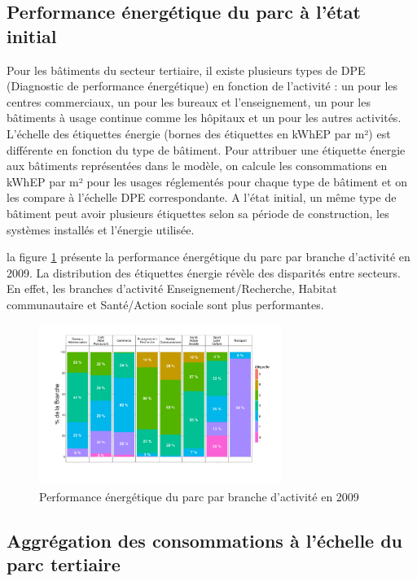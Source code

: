 \documentclass[10.5pt,a4paper]{article}
\begin{document}
{\subsection{Performance énergétique du parc à l'état initial}

Pour les bâtiments du secteur tertiaire, il existe plusieurs types de DPE (Diagnostic de performance énergétique) en fonction de l’activité : un pour les centres commerciaux, un pour les bureaux et l'enseignement, un pour les bâtiments à usage continue comme les hôpitaux et un pour les autres activités. L'échelle des étiquettes énergie (bornes des étiquettes en kWhEP par m²) est différente en fonction du type de bâtiment. Pour attribuer une étiquette énergie aux bâtiments représentées dans le modèle, on calcule les consommations en kWhEP par m² pour les usages réglementés pour chaque type de bâtiment et on les compare à l'échelle DPE correspondante. A l'état initial, un même type de bâtiment peut avoir plusieurs étiquettes selon sa période de construction, les systèmes installés et l'énergie utilisée.  

la figure \ref{Parcetiqbranche} présente la performance énergétique du parc par branche d'activité en 2009. La distribution des étiquettes énergie révèle des disparités entre secteurs. En effet, les branches d’activité Enseignement/Recherche, Habitat communautaire et Santé/Action sociale sont  plus performantes.

\begin{figure}[ht]
\centering
\caption{Performance énergétique du parc par branche d'activité en 2009}\label{Parcetiqbranche}
\includegraphics[width = 0.7\textwidth]{Parcetiqbranche} 
\end{figure}

\newpage

\subsection{Aggrégation des consommations à l'échelle du parc tertiaire}

}
\end{document}
